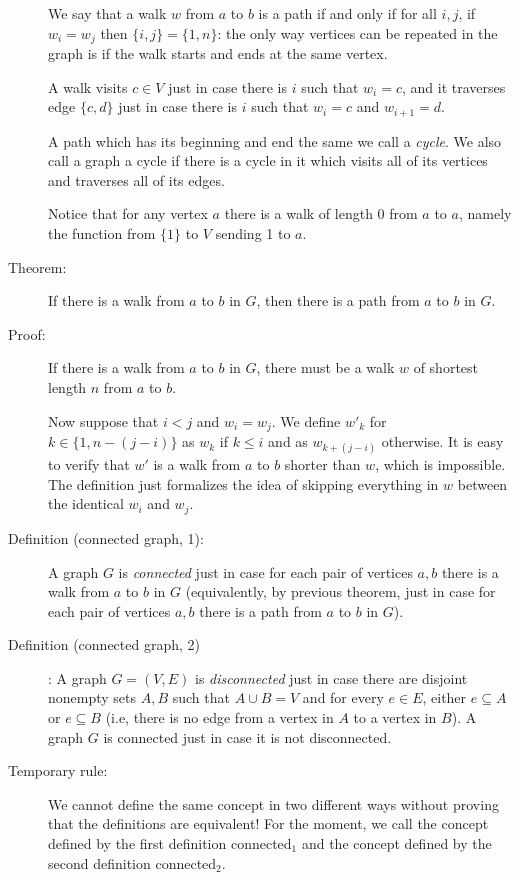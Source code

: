 \documentclass[12pt]{article}
\begin{document}
\begin{description}
We say that a walk $w$ from $a$ to $b$ is a path if and only if for all $i,j$, if $w_i = w_j$ then $\{i,j\}=\{1,n\}$:  the only way vertices can be repeated in the graph is if the walk starts and ends at the same vertex.

A walk visits $c \in V$ just in case there is $i$ such that $w_i = c$, and it traverses edge $\{c,d\}$ just in case there is $i$ such that $w_i = c$ and $w_{i+1}=d$.

A path which has its beginning and end the same we call a {\em cycle\/}.  We also call a graph a cycle if there is a cycle in it which visits all of its vertices and traverses all of its edges.

Notice that for
any vertex $a$ there is a walk of length 0 from $a$ to $a$, namely the function from $\{1\}$ to $V$ sending 1 to $a$.

\item[Theorem:]  If there is a walk from $a$ to $b$ in $G$, then there is a path from $a$ to $b$ in $G$.

\item[Proof:]  If there is a walk from $a$ to $b$ in $G$, there must be a walk $w$ of shortest length $n$ from $a$ to $b$.

Now suppose that $i < j$ and $w_i = w_j$.  We define $w'_k$  for $k \in \{1,n-(j-i)\}$ as  $w_k$ if $k \leq i$ and as $w_{k+(j-i)}$ otherwise.  It is easy to verify that $w'$ is a walk from $a$ to $b$ shorter than $w$, which is impossible.  The definition just formalizes the idea of skipping everything in $w$ between the identical $w_i$ and $w_j$.

\item[Definition (connected graph, 1):]  A graph $G$ is {\em connected\/} just in case for each pair of vertices $a,b$
there is a walk from $a$ to $b$ in $G$ (equivalently, by previous theorem, just in case for each pair of vertices $a,b$ there is a path from $a$ to $b$ in $G$).

\item[Definition (connected graph, 2)]:  A graph $G=(V,E)$ is {\em disconnected\/} just in case there
are disjoint nonempty sets $A,B$ such that $A \cup B = V$ and for every $e \in E$, either $e \subseteq A$ or $e \subseteq B$ (i.e, there is no edge from a vertex in $A$ to a vertex in $B$).  A graph $G$ is connected just in case it is not disconnected.

\item[Temporary rule:]  We cannot define the same concept in two different ways without proving that the definitions are equivalent!  For the moment, we call the concept defined by the first definition connected$_1$ and the concept defined by the second definition connected$_2$.


\end{description}
\end{document}
